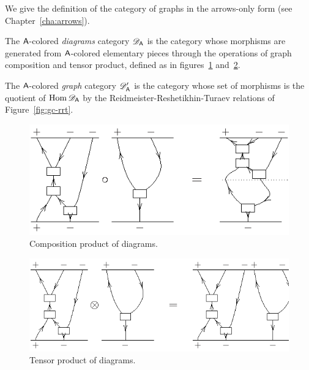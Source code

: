 We give the definition of the category of graphs in the arrows-only
form (see Chapter~\ref{cha:arrows}). 
\begin{definition}
  The $\A$-colored \emph{diagrams} category $\RTD[\A]$ is the category
  whose morphisms are generated from $\A$-colored elementary pieces
  through the operations of graph composition and tensor product,
  defined as in figures~\ref{fig:gc-graph-composition}
  and~\ref{fig:gc-graph-otimes}.
  
  The $\A$-colored \emph{graph} category $\RTE[\A]$ is the category
  whose set of morphisms is the quotient of $\Hom\RTD[\A]$ by the
  Reidmeister-Reshetikhin-Turaev relations of Figure~\ref{fig:gc-rrt}.
\end{definition}
\begin{figure}[p]
  \centering\includegraphics{fig-001}
  \caption{Composition product of diagrams.}
  \label{fig:gc-graph-composition}
\end{figure}
\begin{figure}[p]
  \centering\includegraphics{fig-002}
  \caption{Tensor product of diagrams.}
  \label{fig:gc-graph-otimes}
\end{figure}
